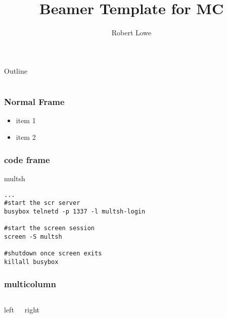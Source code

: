 \documentclass{beamer}
\title{Beamer Template for MC}
\author{Robert Lowe\\}
\institute[Maryville College] %
{
  Division of Mathematics and Computer Science\\
  Maryville College
}
\date[]{}
\begin{document}
\begin{frame}
  \titlepage
\end{frame}

\begin{frame}{Outline}
  \tableofcontents
\end{frame}





\section{}
\begin{frame}
  \frametitle{Normal Frame}
  \begin{itemize}
    \item item 1
    \item item 2
  \end{itemize}
\end{frame}


\begin{frame}[fragile]
  \frametitle{code frame}
  \begin{block}{multsh}
\begin{verbatim}
...
#start the scr server
busybox telnetd -p 1337 -l multsh-login

#start the screen session
screen -S multsh

#shutdown once screen exits
killall busybox
\end{verbatim}
  \end{block}
\end{frame}


\begin{frame}
  \frametitle{multicolumn}
  \begin{columns}
  \begin{block}{left}
  \end{block}
  \begin{block}{right}
  \end{block}
  \end{columns}
\end{frame}
\end{document}
